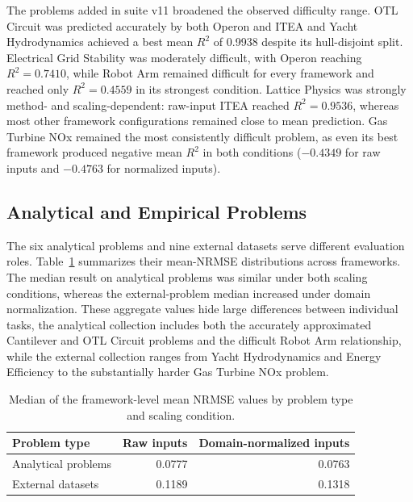 \documentclass[12pt,oneside,bibtotoc,liststotoc]{scrbook}
\begin{document}
The problems added in suite v11 broadened the observed difficulty range. OTL Circuit was predicted accurately by both Operon and ITEA and Yacht Hydrodynamics achieved a best mean $R^2$ of 0.9938 despite its hull-disjoint split. Electrical Grid Stability was moderately difficult, with Operon reaching $R^2=0.7410$, while Robot Arm remained difficult for every framework and reached only $R^2=0.4559$ in its strongest condition. Lattice Physics was strongly method- and scaling-dependent: raw-input ITEA reached $R^2=0.9536$, whereas most other framework configurations remained close to mean prediction. Gas Turbine NOx remained the most consistently difficult problem, as even its best framework produced negative mean $R^2$ in both conditions ($-0.4349$ for raw inputs and $-0.4763$ for normalized inputs).

\subsection{Analytical and Empirical Problems}

The six analytical problems and nine external datasets serve different evaluation roles. Table~\ref{tab:results-problem-types} summarizes their mean-NRMSE distributions across frameworks. The median result on analytical problems was similar under both scaling conditions, whereas the external-problem median increased under domain normalization. These aggregate values hide large differences between individual tasks, the analytical collection includes both the accurately approximated Cantilever and OTL Circuit problems and the difficult Robot Arm relationship, while the external collection ranges from Yacht Hydrodynamics and Energy Efficiency to the substantially harder Gas Turbine NOx problem.

\begin{table}[H]
    \centering
    \caption{Median of the framework-level mean NRMSE values by problem type and scaling condition.}
    \label{tab:results-problem-types}
    \begin{tabular}{lrr}
        \toprule
        Problem type & Raw inputs & Domain-normalized inputs \\
        \midrule
        Analytical problems & 0.0777 & 0.0763 \\
        External datasets & 0.1189 & 0.1318 \\
        \bottomrule
    \end{tabular}
\end{table}
\end{document}
